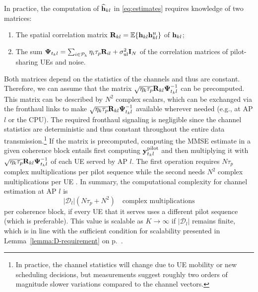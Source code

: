 In practice, the computation of $\widehat{\mathbf{h}}_{kl}$ in \eqref{eq:estimates} requires knowledge of two matrices: 
\begin{enumerate}
\item The spatial correlation matrix $\vect{R}_{kl}=\mathbb{E}\{  \vect{h}_{kl} \vect{h}_{kl}^{\Htran} \}$ of $\mathbf{h}_{kl}$; 
\item
The sum $\mathbf{\Psi}_{t_kl} = \sum_{i \in \mathcal{P}_k} \eta_i\tau_p \mathbf{R}_{il} + \sigma^2_{\mathrm{ul}} \mathbf{I}_{N}$ of the correlation matrices of pilot-sharing UEs and noise.
\end{enumerate}
Both matrices depend on the statistics of the channels and thus are constant.
Therefore, we can assume that the matrix $\sqrt{\eta_k \tau_p} \mathbf{R}_{kl} \mathbf{\Psi}_{t_kl}^{-1}$ can be precomputed. This matrix can be described by $N^{2}$ complex scalars, which can be exchanged via the fronthaul links to make $\sqrt{\eta_k \tau_p} \mathbf{R}_{kl} \mathbf{\Psi}_{t_kl}^{-1}$ available wherever needed (e.g., at AP $l$ or the CPU). The required fronthaul signaling is negligible since the channel statistics are deterministic and thus constant throughout the entire data transmission.\footnote{In practice, the channel statistics will change due to UE mobility or new scheduling decisions, but measurements suggest roughly two orders of magnitude slower variations compared to the channel vectors.}
If the matrix is precomputed, computing the MMSE estimate in a given coherence block entails first computing $\mathbf{y}_{t_kl}^{\rm{pilot}}$ and then multiplying it with $\sqrt{\eta_k \tau_p} \mathbf{R}_{kl} \mathbf{\Psi}_{t_kl}^{-1}$ of each UE served by AP $l$.
The first operation requires $N\tau_p$ complex multiplications per pilot sequence while the second needs $N^{2}$ complex multiplications per UE \cite[Sec.~3.4]{massivemimobook}. 
In summary, the computational complexity for channel estimation at AP $l$ is
\begin{equation} \label{eq:complexity-estimation}
|\mathcal{D}_l| (N\tau_p + N^{2}) \quad \textrm{complex multiplications}
\end{equation}
per coherence block, if every UE that it serves uses a different pilot sequence (which is preferable). This value is scalable as $K \to \infty$ if $|\mathcal{D}_l| $ remains finite, which is in line with the sufficient condition for scalability presented in Lemma~\ref{lemma:D-requirement} on p.~\pageref{lemma:D-requirement}.

